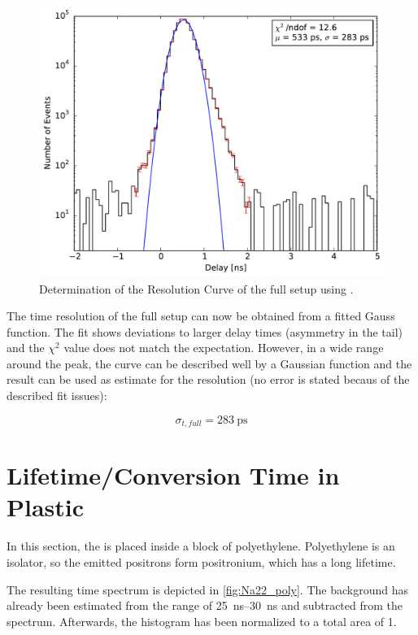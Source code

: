 \documentclass[
	paper=A4,
	parskip=full,
	chapterprefix=true,
	11pt,
	headings=normal,
	bibliography=totoc,
	listof=totoc,
	titlepage=on,
]{scrreprt}
\begin{document}
\begin{figure}
	\centering
	\includegraphics{resolution_peak}
	\caption{Determination of the Resolution Curve of the full setup using .}
	\label{fig:resolution_peak}
\end{figure}

The time resolution of the full setup can now be obtained from a fitted Gauss function. The fit shows deviations to larger delay times (asymmetry in the tail) and the $\chi^2$ value does not match the expectation. However, in a wide range around the peak, the curve can be described well by a Gaussian function and the result can be used as estimate for the resolution (no error is stated becaus of the described fit issues):

\begin{equation}
	\sigma_{t,full}=\SI{283}{\pico\second}
\end{equation}
\FloatBarrier
\section{Lifetime/Conversion Time in Plastic}
In this section, the  is placed inside a block of polyethylene. Polyethylene is an isolator, so the emitted positrons form positronium, which has a long lifetime. 

The resulting time spectrum is depicted in \ref{fig:Na22_poly}. The background has already been estimated from the range of \SIrange{25}{30}{\nano\second} and subtracted from the spectrum. Afterwards, the histogram has been normalized to a total area of \num{1}.
\end{document}
